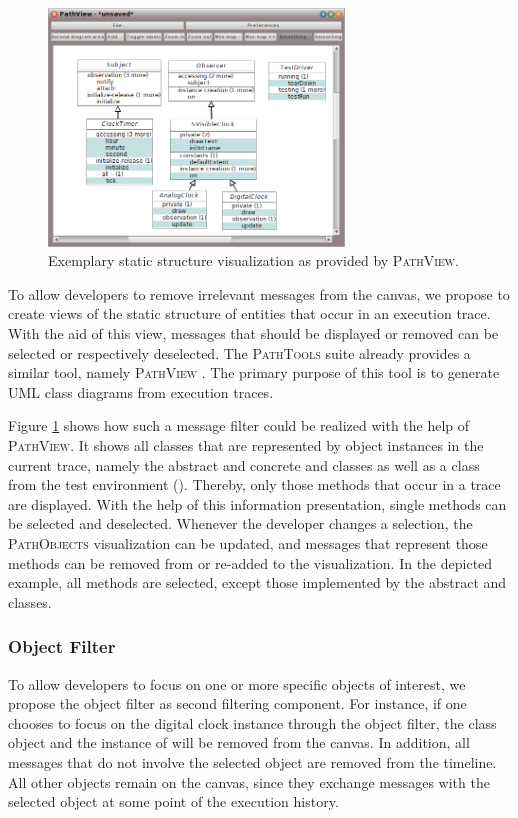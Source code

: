 \begin{figure}[tb]
	\centering
	\includegraphics[width=0.7\textwidth]{../images/04-ImplMessageFilter}
	\caption[Exemplary Static Structure Visualization]{Exemplary static structure visualization as provided by \textsc{PathView}.}
	\label{fig:ImplementationFocusingMessages}
\end{figure}

To allow developers to remove irrelevant messages from the canvas, we propose to create views of the static structure of entities that occur in an execution trace.
With the aid of this view, messages that should be displayed or removed can be selected or respectively deselected.
The \textsc{PathTools} suite already provides a similar tool, namely \textsc{PathView} \cite{perscheid_test-driven_2013}.
The primary purpose of this tool is to generate UML class diagrams from execution traces.

Figure \ref{fig:ImplementationFocusingMessages} shows how such a message filter could be realized with the help of \textsc{PathView}.
It shows all classes that are represented by object instances in the current trace, namely the abstract and concrete  and  classes as well as a class from the test environment ().
Thereby, only those methods that occur in a trace are displayed.
With the help of this information presentation, single methods can be selected and deselected.
Whenever the developer changes a selection, the \textsc{PathObjects} visualization can be updated, and messages that represent those methods can be removed from or re-added to the visualization.
In the depicted example, all methods are selected, except those implemented by the abstract  and  classes.

\subsubsection{Object Filter}
To allow developers to focus on one or more specific objects of interest, we propose the object filter as second filtering component.
For instance, if one chooses to focus on the digital clock instance through the object filter, the  class object and the instance of  will be removed from the canvas.
In addition, all messages that do not involve the selected object are removed from the timeline.
All other objects remain on the canvas, since they exchange messages with the selected object at some point of the execution history.

